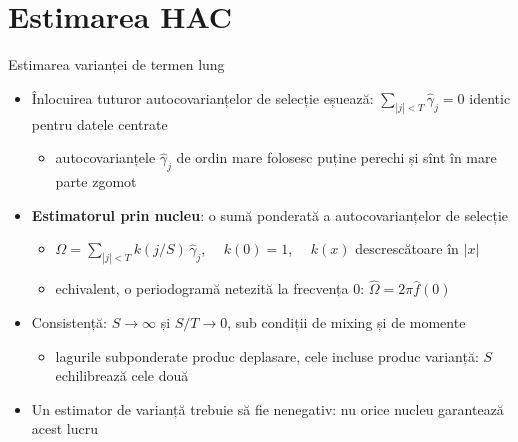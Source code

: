 \section{Estimarea HAC}

\begin{frame}{Estimarea varianței de termen lung}
\itemsize{\small}
\begin{itemize}
    \item Înlocuirea tuturor autocovarianțelor de selecție eșuează: $\sum_{|j|<T}\hat\gamma_j = 0$ identic pentru datele centrate
    \begin{itemize}
        \item autocovarianțele $\hat\gamma_j$ de ordin mare folosesc puține perechi și sînt în mare parte zgomot
    \end{itemize}
    \item \textbf{Estimatorul prin nucleu}: o sumă ponderată a autocovarianțelor de selecție
    \begin{itemize}
        \item $\hat\Omega = \sum_{|j|<T} k(j/S)\,\hat\gamma_j$, $\quad k(0) = 1$, $\quad k(x)$ descrescătoare în $|x|$
        \item echivalent, o periodogramă netezită la frecvența 0: $\hat\Omega = 2\pi\hat f(0)$ 
    \end{itemize}
    \item Consistență: $S \to \infty$ și $S/T \to 0$, sub condiții de mixing și de momente 
    \begin{itemize}
        \item lagurile subponderate produc deplasare, cele incluse produc varianță: $S$ echilibrează cele două
    \end{itemize}
    \item Un estimator de varianță trebuie să fie nenegativ: nu orice nucleu garantează acest lucru
\end{itemize}
\end{frame}

